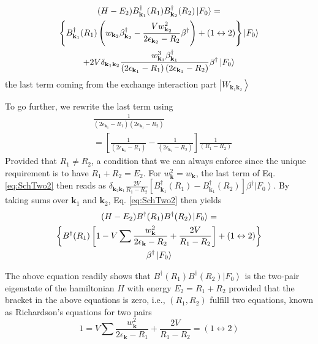 \documentclass[aps,prb,superscriptaddress,showpacs,reprint,lengthcheck]{revtex4-1}
\begin{document}
\begin{multline}  \label{eq:SchTwo2}
(H-E _2)B^{\dagger}_{\mathbf{k} _1}(R_1)B^{\dagger}_{\mathbf{k}
_2}(R_2)\left|F_0\right>   = \\
\left\{B^{\dagger}_{\mathbf{k} _1}(R_1)\left(w_{\mathbf{k}
_2}\beta^{\dagger}_{\mathbf{k} _2}-\frac{Vw_{\mathbf{k} _2}^2}{2\epsilon_{%
\mathbf{k} _2}-R_2}\beta^{\dagger}\right)+(1\leftrightarrow2)\right\}
\left|F_0\right>  \\
+2V\delta_{{\mathbf{k} _1}{\mathbf{k} _2}}\frac{w^3_{{\mathbf{k} _1}}\beta^\dagger_{{\mathbf{k} _1}}}{\left(2%
\epsilon_{\mathbf{k} _1}-R_1\right) \left(2\epsilon_{\mathbf{k}
_1}-R_2\right)}\beta^\dagger\left|F_0\right>  
\end{multline}
the last term coming from the exchange interaction part $\left|W_{\mathbf{k} _1\mathbf{k} _2}\right>$

To go further, we rewrite the last term using 
\begin{equation}\label{eq:inverse}
\begin{split}
&\frac{1}{\left(2\epsilon_{\mathbf{k} _1}-R_1\right)
\left(2\epsilon_{\mathbf{k} _1}-R_2\right)}\\&=\left[
\frac{1}{\left(2\epsilon_{\mathbf{k} _1}-R_1\right)}-\frac{1}{\left(2\epsilon_{\mathbf{k}
_1}-R_2\right) }\right]\frac1{\left(R_1-R_2\right) } 
\end{split}
\end{equation}
Provided that $R_1\neq{}R_2$,
a condition that we can always enforce since the unique requirement is to have $R_1+R_2=E_2$. For $w^2_{{\mathbf{k} }}=w_{{\mathbf{k} }}$, the last term of Eq. \eqref{eq:SchTwo2} then reads as $\delta_{{\mathbf{k} _2}{\mathbf{k} _1}}\frac{2V}{R_1-R_2}[B^{\dagger}_{\mathbf{k} _1}(R_1)-B^{\dagger}_{\mathbf{k} _1}(R_2)]\beta^\dagger\left|F_0\right>  $. By taking sums over $\mathbf{k} _1$ and $\mathbf{k} _2$, Eq. %
\eqref{eq:SchTwo2} then yields 
\begin{multline}  \label{eq:SchTwo3}
(H-E_2)B^{\dagger}(R_1)B^{\dagger}(R_2)\left|F_0\right>   = \\
\left\{B^{\dagger}(R_1)\left[1-V\sum\frac{w_{\mathbf{k} }^2}{2\epsilon_{%
\mathbf{k} }-R_2}+\frac{2V}{R_1-R_2}\right] +(1\leftrightarrow2)\right\}  \\
\beta^{\dagger}\left|F_0\right>  
\end{multline}


The above equation readily shows that $B^{\dagger}(R_1)B^{\dagger}(R_2)%
\left|F_0\right>  $ is the two-pair eigenstate of the hamiltonian $H$ with  energy $%
E _2=R_1+R_2$ provided that the bracket in the above equations is zero, i.e., $\left(R_1,R_2\right) $ fulfill two
equations, known as Richardson's equations for two pairs 
\begin{equation}
1=V\sum\frac{w_{\mathbf{k} }^2}{2\epsilon_{\mathbf{k} }-R_1}+\frac{2V}{R_1-R_2}%
=(1\leftrightarrow2)
\end{equation}
\end{document}
